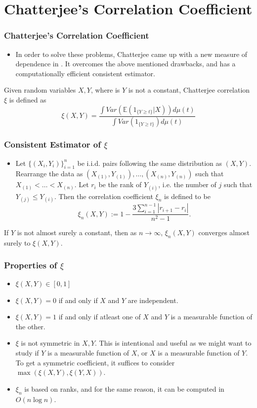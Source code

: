 \documentclass [xcolor=svgnames, t] {beamer}
\begin{document}
\section{Chatterjee's Correlation Coefficient}
\begin{frame}
    \frametitle{Chatterjee's Correlation Coefficient}
    \begin{itemize}
        \item In order to solve these problems, Chatterjee came up with a new measure of dependence in \cite{chatterjee2020sourav}.
        It overcomes the above mentioned drawbacks, and has a computationally efficient consistent estimator.
    \end{itemize}
    \vspace{2em}
    \begin{definition}
        Given random variables $X, Y$, where is $Y$ is not a constant, Chatterjee correlation $\xi$ is defined as
        $$\xi(X, Y) = \frac{\int Var(\mathbb{E}(1_{\{Y \geq t\}}|X)) d\mu(t)}{\int Var(1_{\{Y \geq t\}}) d\mu(t)}$$
    \end{definition}
\end{frame}

\begin{frame}
    \frametitle{Consistent Estimator of $\xi$}
    \begin{itemize}
        \item Let $\{(X_i, Y_i)\}_{i = 1}^n$ be i.i.d. pairs following the same distribution as $(X, Y)$.
        Rearrange the data as $(X_{(1)}, Y_{(1)}), \dots, (X_{(n)}, Y_{(n)})$ such that $X_{(1)} < \dots < X_{(n)}$. Let $r_i$ be the rank of $Y_{(i)}$, i.e. the number of $j$ such that $Y_{(j)} \leq Y_{(i)}$.  Then the correlation coefficient $\xi_n$ is defined to be
		$$\xi_n(X, Y) := 1-\frac{3\sum_{i=1}^{n-1} |r_{i+1} - r_i|}{n^2-1}.$$
    \end{itemize}
    \begin{theorem}
        If $Y$ is not almost surely a constant, then as $n \rightarrow \infty$, $\xi_n(X, Y)$ converges almost surely to $\xi(X, Y)$.
    \end{theorem}
\end{frame}

\begin{frame}
    \frametitle{Properties of $\xi$}
    \begin{itemize}
        \item $\xi(X, Y) \in [0, 1]$
		\item $\xi(X, Y) = 0$ if and only if $X$ and $Y$ are independent.
		\item $\xi(X, Y) = 1$ if and only if atleast one of $X$ and $Y$ is a measurable function of the other.
		\item $\xi$ is not symmetric in $X, Y$. This is intentional and useful as we might want to study if $Y$ is a measurable function of $X$, or $X$ is a measurable function of $Y$. To get a symmetric coefficient, it suffices to consider $\max(\xi(X, Y), \xi(Y, X))$.
		\item $\xi_n$ is based on ranks, and for the same reason, it can be computed in $O(n\log n)$.
    \end{itemize}
\end{frame}
\end{document}

